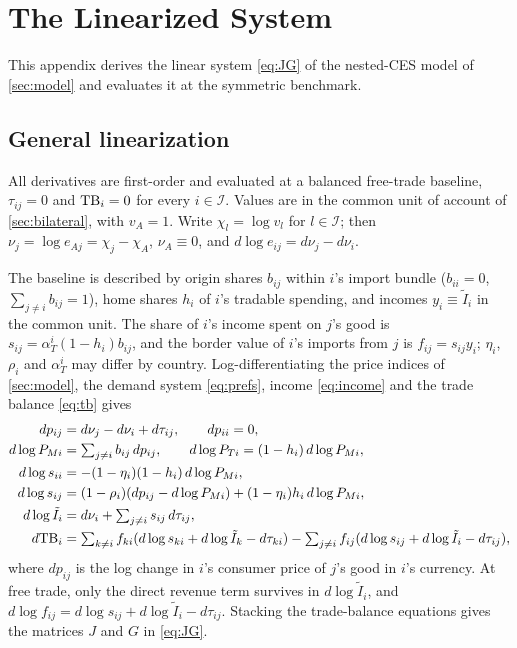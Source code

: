 \section{The Linearized System}
\label{app:linear}

This appendix derives the linear system \cref{eq:JG} of the nested-CES model of \cref{sec:model} and evaluates it at the symmetric benchmark.

\subsection{General linearization}

All derivatives are first-order and evaluated at a balanced free-trade baseline, $\tau_{ij}=0$ and $\mathrm{TB}_i=0$ for every $i\in\mathcal I$. Values are in the common unit of account of \cref{sec:bilateral}, with $v_A=1$. Write $\chi_l=\log v_l$ for $l\in\mathcal I$; then $\nu_j=\log e_{Aj}=\chi_j-\chi_A$, $\nu_A\equiv0$, and $d\log e_{ij}=d\nu_j-d\nu_i$.

The baseline is described by origin shares $b_{ij}$ within $i$'s import bundle ($b_{ii}=0$, $\sum_{j\neq i}b_{ij}=1$), home shares $h_i$ of $i$'s tradable spending, and incomes $y_i\equiv\tilde I_i$ in the common unit. The share of $i$'s income spent on $j$'s good is $s_{ij}=\alpha_T^i(1-h_i)b_{ij}$, and the border value of $i$'s imports from $j$ is $f_{ij}=s_{ij}y_i$; $\eta_i$, $\rho_i$ and $\alpha_T^i$ may differ by country. Log-differentiating the price indices of \cref{sec:model}, the demand system \cref{eq:prefs}, income \cref{eq:income} and the trade balance \cref{eq:tb} gives
\begin{equation}
\begin{aligned}
dp_{ij}&=d\nu_j-d\nu_i+d\tau_{ij},\qquad dp_{ii}=0,\\
d\log P_{Mi}&=\textstyle\sum_{j\neq i}b_{ij}\,dp_{ij},\qquad d\log P_{Ti}=(1-h_i)\,d\log P_{Mi},\\
d\log s_{ii}&=-(1-\eta_i)(1-h_i)\,d\log P_{Mi},\\
d\log s_{ij}&=(1-\rho_i)(dp_{ij}-d\log P_{Mi})+(1-\eta_i)h_i\,d\log P_{Mi},\\
d\log\tilde I_i&=d\nu_i+\textstyle\sum_{j\neq i}s_{ij}\,d\tau_{ij},\\
d\mathrm{TB}_i&=\textstyle\sum_{k\neq i}f_{ki}(d\log s_{ki}+d\log\tilde I_k-d\tau_{ki})-\sum_{j\neq i}f_{ij}(d\log s_{ij}+d\log\tilde I_i-d\tau_{ij}),
\end{aligned}
\label{eq:linear}
\end{equation}
where $dp_{ij}$ is the log change in $i$'s consumer price of $j$'s good in $i$'s currency. At free trade, only the direct revenue term survives in $d\log\tilde I_i$, and $d\log f_{ij}=d\log s_{ij}+d\log\tilde I_i-d\tau_{ij}$. Stacking the trade-balance equations gives the matrices $J$ and $G$ in \cref{eq:JG}.

